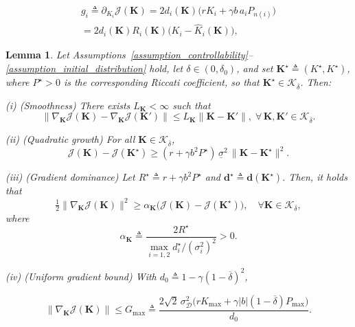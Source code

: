 \documentclass[10pt,a4paper]{amsart}
\newtheorem{lemma}{Lemma}
\newcommand{\bK}{\mathbf{K}}
\newcommand{\cD}{\mathcal{D}}
\newcommand{\cJ}{\mathcal{J}}
\newcommand{\cK}{\mathcal{K}}
\newcommand{\slo}{\underline{\sigma}}
\begin{document}
\begin{equation}\label{eq_occupancy_gradient}
    \begin{gathered}
    g_i\triangleq\partial_{K_i}\cJ(\bK)
      =2d_i(\bK)\bigl(rK_i+\gamma b\,a_iP_{n(i)}\bigr)
      \\
      =2d_i(\bK)R_i(\bK)\bigl(K_i-\widehat K_i(\bK)\bigr),
    \end{gathered}
\end{equation}

\begin{lemma}\label{lemma_J_geometry}
    Let Assumptions~\ref{assumption_controllability}--\ref{assumption_initial_distribution} hold, let $\delta\in(0,\delta_0)$, and set $\bK^\star \triangleq (K^{\star}, K^{\star})$, where $P^{\star} > 0$ is the corresponding Riccati coefficient, so that $\bK^{\star} \in \cK_{\overline{\delta}}$. Then:
 
    (i) (Smoothness) There exists $L_\bK<\infty$ such that
    \begin{equation}
        \| \nabla_{\bK} \cJ(\bK) {-} \nabla_{\bK} \cJ(\bK')\|
        {\le}
        L_\bK \|\bK {-} \bK'\|,
        \; \forall\, \bK, \bK' {\in} \cK_{\overline{\delta}}.
    \end{equation}
 
    (ii) (Quadratic growth) For all $\bK \in \cK_{\overline{\delta}}$,
    \begin{equation}
        \cJ(\bK)-\cJ(\bK^\star)
        \ge
        (r+\gamma b^2P^\star)\,\slo^{2} \,\|\bK - \bK^\star\|^2.
    \end{equation}
 
    (iii) (Gradient dominance) Let $R^{\star}\triangleq r+\gamma b^2P^{\star}$ and $\mathbf d^{\star}\triangleq\mathbf d(\bK^{\star})$. Then, it holds that
      \begin{equation}
        \tfrac{1}{2} \| \nabla_{\bK} \cJ(\bK)\|^2
        \ge
        \alpha_{\bK} \bigl( \cJ(\bK) - \cJ(\bK^\star) \bigr),
        \quad
        \forall \bK \in \cK_{\overline{\delta}},
    \end{equation}
    where
    \begin{equation}\label{eq_explicit_pl}
        \alpha_{\bK}\triangleq
        \frac{2R^{\star}}{\max_{i=1,2}d_i^{\star}/(\sigma_i^2)^2}>0.
    \end{equation}
  
 
    (iv) (Uniform gradient bound) With $d_0 \triangleq 1 - \gamma(1 - \overline{\delta})^{2}$,

    \vspace{-0.2cm}
    \begin{equation}
        \|\nabla_{\bK} \cJ(\bK)\| {\le} G_{\max}
        {\triangleq}
        \frac{2\sqrt{2}\,\sigma_{\cD}^2 \bigl(rK_{\max}+\gamma |b|(1-\overline\delta)P_{\max}\bigr)}{ d_0}.
    \end{equation}
    \vspace{-0.2cm}
 

\end{lemma}
\end{document}
